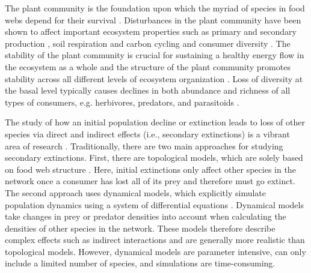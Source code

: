 \documentclass[12pt]{article}
\begin{document}
\begin{spacing}{2.0}
     The plant community is the foundation upon which the myriad of species in food webs depend for their survival \citep{}. Disturbances in the plant community have been shown to affect important ecosystem properties such as primary \citep{} and secondary production \citep{}, soil respiration and carbon cycling \citep{} and consumer diversity \citep{scherber2010bottom,Baiser2013}. The stability of the plant community is crucial for sustaining a healthy energy flow in the ecosystem as a whole \citep{Rosenblatt2016} and the structure of the plant community promotes stability across all different levels of ecosystem organization \citep{proulx2010diversity,scherber2010bottom}. Loss of diversity at the basal level typically causes declines in both abundance and richness of all types of consumers, e.g. herbivores, predators, and parasitoids \citep{scherber2010bottom}.
    
    The study of how an initial population decline or extinction leads to loss of other species via direct and indirect effects (i.e., secondary extinctions) is a vibrant area of research \citep{curtsdotter2011robustness, dunne2009cascading, Eklof2006}. Traditionally, there are two main approaches for studying secondary extinctions. First, there are topological models, which are solely based on food web structure \citep{dunne2009cascading}. Here, initial extinctions only affect other species in the network once a consumer has lost all of its prey and therefore must go extinct. The second approach uses dynamical models, which explicitly simulate population dynamics using a system of differential equations \citep{binzer2011susceptibility}. Dynamical models take changes in prey or predator densities into account when calculating the densities of other species in the network. These models therefore describe complex effects such as indirect interactions and are generally more realistic than topological models. However, dynamical models are parameter intensive, can only include a limited number of species, and simulations are time-consuming. 
    

\end{spacing}
\end{document}
